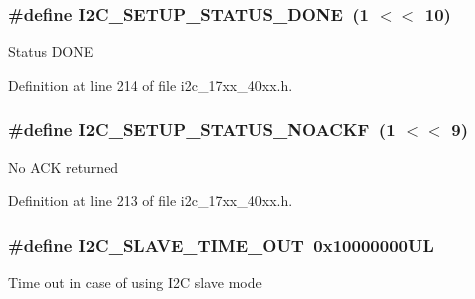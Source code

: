 \subsubsection[{\texorpdfstring{I2\+C\+\_\+\+S\+E\+T\+U\+P\+\_\+\+S\+T\+A\+T\+U\+S\+\_\+\+D\+O\+NE}{I2C_SETUP_STATUS_DONE}}]{\setlength{\rightskip}{0pt plus 5cm}\#define I2\+C\+\_\+\+S\+E\+T\+U\+P\+\_\+\+S\+T\+A\+T\+U\+S\+\_\+\+D\+O\+NE~(1 $<$$<$ 10)}\hypertarget{group__I2C__17XX__40XX_gaefbb25ca99e199765e7dcdd6ef343590}{}\label{group__I2C__17XX__40XX_gaefbb25ca99e199765e7dcdd6ef343590}
Status D\+O\+NE 

Definition at line 214 of file i2c\+\_\+17xx\+\_\+40xx.\+h.

\subsubsection[{\texorpdfstring{I2\+C\+\_\+\+S\+E\+T\+U\+P\+\_\+\+S\+T\+A\+T\+U\+S\+\_\+\+N\+O\+A\+C\+KF}{I2C_SETUP_STATUS_NOACKF}}]{\setlength{\rightskip}{0pt plus 5cm}\#define I2\+C\+\_\+\+S\+E\+T\+U\+P\+\_\+\+S\+T\+A\+T\+U\+S\+\_\+\+N\+O\+A\+C\+KF~(1 $<$$<$ 9)}\hypertarget{group__I2C__17XX__40XX_ga90a37b470118d82b9682cfc2e0b4de84}{}\label{group__I2C__17XX__40XX_ga90a37b470118d82b9682cfc2e0b4de84}
No A\+CK returned 

Definition at line 213 of file i2c\+\_\+17xx\+\_\+40xx.\+h.

\subsubsection[{\texorpdfstring{I2\+C\+\_\+\+S\+L\+A\+V\+E\+\_\+\+T\+I\+M\+E\+\_\+\+O\+UT}{I2C_SLAVE_TIME_OUT}}]{\setlength{\rightskip}{0pt plus 5cm}\#define I2\+C\+\_\+\+S\+L\+A\+V\+E\+\_\+\+T\+I\+M\+E\+\_\+\+O\+UT~0x10000000\+UL}\hypertarget{group__I2C__17XX__40XX_ga33116b352c72ef28879812c66387f17a}{}\label{group__I2C__17XX__40XX_ga33116b352c72ef28879812c66387f17a}
Time out in case of using I2C slave mode 

